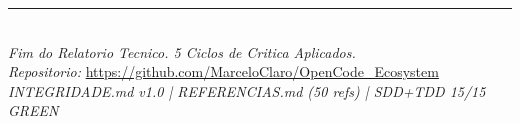 \documentclass[12pt,a4paper,oneside]{article}
\begin{document}

\newpage\appendix



\vspace{12pt}\begin{center}\rule{0.4\textwidth}{0.4pt}\\[6pt]
\textit{Fim do Relatorio Tecnico. 5 Ciclos de Critica Aplicados.}\\[6pt]
\textit{Repositorio:} \url{https://github.com/MarceloClaro/OpenCode\_Ecosystem}\\[3pt]
\textit{INTEGRIDADE.md v1.0 | REFERENCIAS.md (50 refs) | SDD+TDD 15/15 GREEN}
\end{center}
\end{document}

